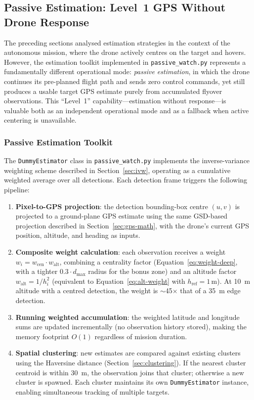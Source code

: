 \subsection{Passive Estimation: Level~1 GPS Without Drone Response}\label{sec:passive-estimation}

The preceding sections analysed estimation strategies in the context of the autonomous mission, where the drone actively centres on the target and hovers.  However, the estimation toolkit implemented in \texttt{passive\_watch.py} represents a fundamentally different operational mode: \emph{passive estimation}, in which the drone continues its pre-planned flight path and sends zero control commands, yet still produces a usable target GPS estimate purely from accumulated flyover observations.  This ``Level~1'' capability---estimation without response---is valuable both as an independent operational mode and as a fallback when active centering is unavailable.

\subsubsection{Passive Estimation Toolkit}\label{sec:passive-toolkit}

The \texttt{DummyEstimator} class in \texttt{passive\_watch.py} implements the inverse-variance weighting scheme described in Section~\ref{sec:ivw}, operating as a cumulative weighted average over all detections.  Each detection frame triggers the following pipeline:

\begin{enumerate}
  \item \textbf{Pixel-to-GPS projection}: the detection bounding-box centre $(u, v)$ is projected to a ground-plane GPS estimate using the same GSD-based projection described in Section~\ref{sec:gps-math}, with the drone's current GPS position, altitude, and heading as inputs.
  \item \textbf{Composite weight calculation}: each observation receives a weight $w_i = w_\mathrm{cen} \cdot w_\mathrm{alt}$, combining a centrality factor (Equation~\ref{eq:weight-deep}, with a tighter $0.3 \cdot d_\mathrm{max}$ radius for the bonus zone) and an altitude factor $w_\mathrm{alt} = 1/h_i^2$ (equivalent to Equation~\ref{eq:alt-weight} with $h_\mathrm{ref} = 1$\,m).  At \SI{10}{\metre} altitude with a centred detection, the weight is $\sim$45$\times$ that of a \SI{35}{\metre} edge detection.
  \item \textbf{Running weighted accumulation}: the weighted latitude and longitude sums are updated incrementally (no observation history stored), making the memory footprint $O(1)$ regardless of mission duration.
  \item \textbf{Spatial clustering}: new estimates are compared against existing clusters using the Haversine distance (Section~\ref{sec:clustering}).  If the nearest cluster centroid is within \SI{30}{\metre}, the observation joins that cluster; otherwise a new cluster is spawned.  Each cluster maintains its own \texttt{DummyEstimator} instance, enabling simultaneous tracking of multiple targets.
\end{enumerate}

